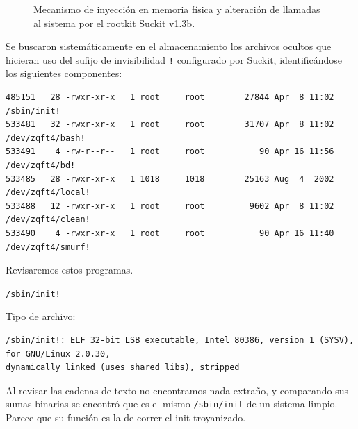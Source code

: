\begin{figure}[htbp]
\caption{Mecanismo de inyección en memoria física y alteración de llamadas al sistema por el rootkit Suckit v1.3b.}
\label{fig:suckit_hooking}
\end{figure}

Se buscaron sistemáticamente en el almacenamiento los archivos ocultos que hicieran uso del sufijo de invisibilidad \texttt{!} configurado por Suckit, identificándose los siguientes componentes:
 
\vspace{1em}

\begin{lstlisting}[style=terminal]
485151   28 -rwxr-xr-x   1 root     root        27844 Apr  8 11:02 /sbin/init!
533481   32 -rwxr-xr-x   1 root     root        31707 Apr  8 11:02 /dev/zqft4/bash!
533491    4 -rw-r--r--   1 root     root           90 Apr 16 11:56 /dev/zqft4/bd!
533485   28 -rwxr-xr-x   1 1018     1018        25163 Aug  4  2002 /dev/zqft4/local!
533488   12 -rwxr-xr-x   1 root     root         9602 Apr  8 11:02 /dev/zqft4/clean!
533490    4 -rwxr-xr-x   1 root     root           90 Apr 16 11:40 /dev/zqft4/smurf!
\end{lstlisting}

\vspace{1em}

 Revisaremos estos programas.

\texttt{/sbin/init!}

Tipo de archivo:

\vspace{1em}

\begin{lstlisting}[style=terminal]
/sbin/init!: ELF 32-bit LSB executable, Intel 80386, version 1 (SYSV), for GNU/Linux 2.0.30, 
dynamically linked (uses shared libs), stripped
\end{lstlisting}

\vspace{1em}

Al revisar las cadenas de texto no encontramos nada extraño, y
comparando sus sumas binarias se encontró que es el mismo \texttt{/sbin/init}
de un sistema limpio. Parece que su función es la de correr el
init troyanizado.

